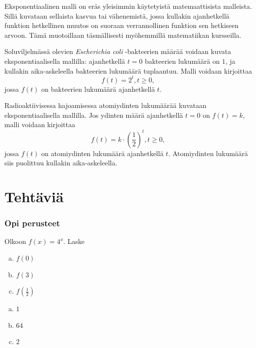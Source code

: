 Eksponentiaalinen malli on eräs yleisimmin käytetyistä matemaattisista
malleista. Sillä kuvataan sellaista kasvua tai vähenemistä, jossa
kullakin ajanhetkellä funktion hetkellinen muutos on suoraan
verrannollinen funktion sen hetkiseen arvoon. Tämä muotoillaan
täsmällisesti myöhemmillä matematiikan kursseilla.

\begin{esimerkki}
Soluviljelmässä olevien \emph{Escherichia coli} -bakteerien
määrää voidaan kuvata eksponentiaalisella mallilla: ajanhetkellä
$t = 0$ bakteerien lukumäärä on $1$, ja kullakin aika-askeleella
bakteerien lukumäärä tuplaantuu. Malli voidaan kirjoittaa
\[
f(t) = 2^t, t \ge 0,
\]
jossa $f(t)$ on bakteerien lukumäärä ajanhetkellä $t$.
\end{esimerkki}

\begin{esimerkki}
Radioaktiivisessa hajoamisessa atomiydinten lukumäärää kuvataan
eksponentiaalisella mallilla. Jos ydinten määrä ajanhetkellä
$t = 0$ on $f(t) = k$, malli voidaan kirjoittaa
\[
f(t) = k \cdot \left( \frac{1}{2} \right)^t, t \ge 0,
\]
jossa $f(t)$ on atomiydinten lukumäärä ajanhetkellä $t$. Atomiydinten
lukumäärä siis puolittuu kullakin aika-askeleella.
\end{esimerkki}

\section*{Tehtäviä}

\subsubsection*{Opi perusteet}

\begin{tehtava}
Olkoon $f(x) = 4^x$. Laske
\begin{enumerate}[a)]
\item $f(0)$
\item $f(3)$
\item $f(\frac{1}{2})$
\end{enumerate}
\begin{vastaus}
\begin{enumerate}[a)]
\item $1$
\item $64$
\item $2$
\end{enumerate}
\end{vastaus}
\end{tehtava}

